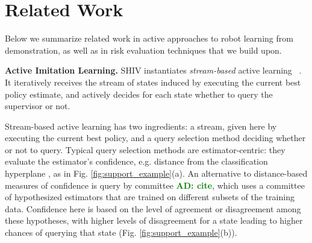 \documentclass[10pt, conference]{ieeeconf}      %
\newcommand{\acro}{SHIV}
\newcommand{\adnote}[1]{\ifthenelse{\boolean{include-notes}}%
 {\textcolor{green}{\textbf{AD: #1}}}{}}
\begin{document}



\section{Related Work}
Below we summarize related work in active approaches to robot learning from demonstration, as well as in risk evaluation techniques that we build upon. 

\noindent\textbf{Active Imitation Learning.}
SHIV instantiates \emph{stream-based} active learning ~\cite{atlas1990training,cohn1994improving}. It iteratively receives the stream of states induced by executing the current best policy estimate, and actively decides for each state whether to query the supervisor or not.

Stream-based active learning has two ingredients: a stream, given here by executing the current best policy, and a query selection method deciding whether or not to query. Typical query selection methods are estimator-centric: they evaluate the estimator's confidence, e.g. distance from the classification hyperplane \cite{tong2002support}, as in Fig. \ref{fig:support_example}(a). An alternative to distance-based measures of confidence is query by committee \adnote{cite}, which uses a committee of hypothesized estimators that are trained on different subsets of the training data. Confidence here is based on the level of agreement or disagreement among these hypotheses, with higher levels of disagreement for a state leading to higher chances of querying that state (Fig. \ref{fig:support_example}(b)).
\end{document}
